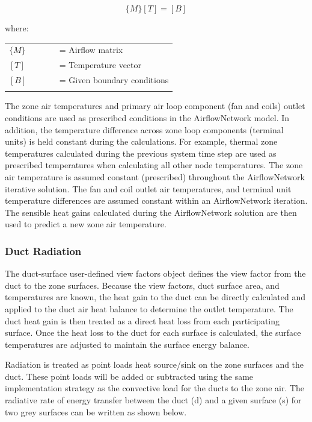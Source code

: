 \begin{equation}
\{ M\} [T] = [B]
\end{equation}

where:

\begin{tabular}{lp{0.7\linewidth}}
\\
$\{M\}$ &= Airflow matrix\\
$[T]$ &= Temperature vector\\
$[B]$ &= Given boundary conditions\\
\\
\end{tabular}

The zone air temperatures and primary air loop component (fan and coils) outlet conditions are used as prescribed conditions in the AirflowNetwork model. In addition, the temperature difference across zone loop components (terminal units) is held constant during the calculations. For example, thermal zone temperatures calculated during the previous system time step are used as prescribed temperatures when calculating all other node temperatures. The zone air temperature is assumed constant (prescribed) throughout the AirflowNetwork iterative solution. The fan and coil outlet air temperatures, and terminal unit temperature differences are assumed constant within an AirflowNetwork iteration. The sensible heat gains calculated during the AirflowNetwork solution are then used to predict a new zone air temperature.

\subsubsection{Duct Radiation}

The duct-surface user-defined view factors object defines the view factor from the duct to the zone surfaces. Because the view factors, duct surface area, and temperatures are known, the heat gain to the duct can be directly calculated and applied to the duct air heat balance to determine the outlet temperature. The duct heat gain is then treated as a direct heat loss from each participating surface. Once the heat loss to the duct for each surface is calculated, the surface temperatures are adjusted to maintain the surface energy balance.

Radiation is treated as point loads heat source/sink on the zone surfaces and the duct.  These point loads will be added or subtracted using the same implementation strategy as the convective load for the ducts to the zone air.  The radiative rate of energy transfer between the duct (d) and a given surface (s) for two grey surfaces can be written as shown below.


